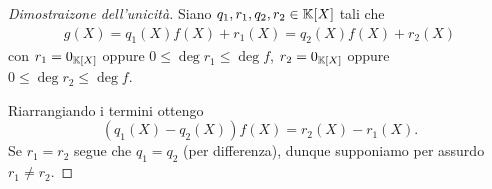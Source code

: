 \begin{proof}[Dimostraizone dell'unicità]
    Siano $q_1, r_1, q_2, r_2 \in \mathbb{K}[X]$ tali che \begin{align*}
        g(X) = q_1(X)f(X) + r_1(X) = q_2(X)f(X) + r_2(X)
    \end{align*} con $r_1 = 0_{\mathbb{K}[X]}$ oppure $0 \leq \deg r_1 \leq \deg f$, $r_2 = 0_{\mathbb{K}[X]}$ oppure $0 \leq \deg r_2 \leq \deg f$.

    Riarrangiando i termini ottengo \[
        (q_1(X) - q_2(X))f(X) = r_2(X) - r_1(X).    
    \] Se $r_1 = r_2$ segue che $q_1 = q_2$ (per differenza), dunque supponiamo per assurdo $r_1 \neq r_2$.
\end{proof}